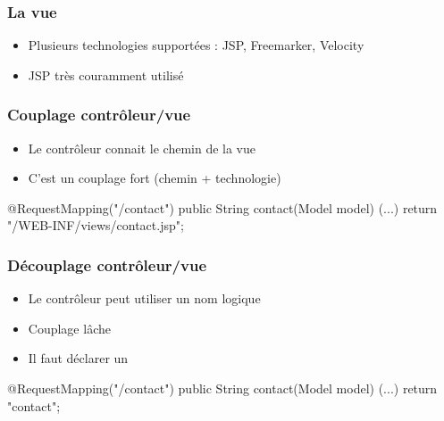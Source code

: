 \begin{frame}[fragile]
 \frametitle{La vue}

 \begin{itemize}
  \item Plusieurs technologies supportées : JSP, Freemarker, Velocity
  \item JSP très couramment utilisé
 \end{itemize}


\end{frame}

\begin{frame}[fragile]
 \frametitle{Couplage contrôleur/vue}

 \begin{itemize}
  \item Le contrôleur connait le chemin de la vue
  \item C'est un couplage fort (chemin + technologie)
 \end{itemize}

 \begin{javacode}
@RequestMapping("/contact")
public String contact(Model model) {
  (...)
  return "/WEB-INF/views/contact.jsp";
}
 \end{javacode}

\end{frame}

\begin{frame}[fragile]
 \frametitle{Découplage contrôleur/vue}

 \begin{itemize}
  \item Le contrôleur peut utiliser un nom logique
  \item Couplage lâche
  \item Il faut déclarer un 
 \end{itemize}

 \begin{javacode}
@RequestMapping("/contact")
public String contact(Model model) {
  (...)
  return "contact";
}
 \end{javacode}

\end{frame}

